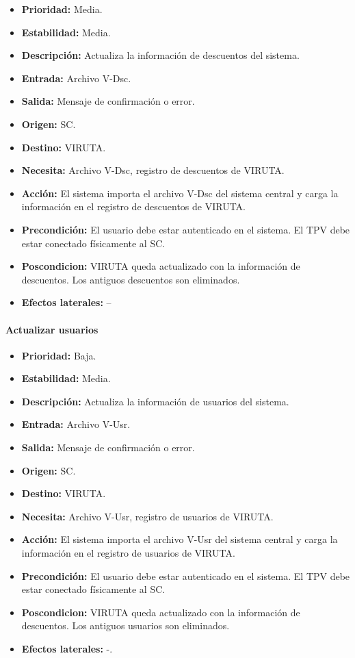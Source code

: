 \begin{itemize}
\item \textbf{Prioridad:} Media.
\item \textbf{Estabilidad:} Media.
\item \textbf{Descripción:} Actualiza la información de descuentos del sistema.
\item \textbf{Entrada:} Archivo V-Dsc.
\item \textbf{Salida:} Mensaje de confirmación o error.
\item \textbf{Origen:} SC.
\item \textbf{Destino:} VIRUTA.
\item \textbf{Necesita:} Archivo V-Dsc, registro de descuentos de VIRUTA.
\item \textbf{Acción:} El sistema importa el archivo V-Dsc del sistema central y carga la información en el registro de descuentos de VIRUTA.
\item \textbf{Precondición:} El usuario debe estar autenticado en el sistema. El TPV debe estar conectado físicamente al SC.
\item \textbf{Poscondicion:} VIRUTA queda actualizado con la información de descuentos. Los antiguos descuentos son eliminados.
\item \textbf{Efectos laterales:} --
\end{itemize}

\paragraph{Actualizar usuarios}

\begin{itemize}
\item \textbf{Prioridad:} Baja.
\item \textbf{Estabilidad:} Media.
\item \textbf{Descripción:} Actualiza la información de usuarios del sistema.
\item \textbf{Entrada:} Archivo V-Usr.
\item \textbf{Salida:} Mensaje de confirmación o error.
\item \textbf{Origen:} SC.
\item \textbf{Destino:} VIRUTA.
\item \textbf{Necesita:} Archivo V-Usr, registro de usuarios de VIRUTA.
\item \textbf{Acción:} El sistema importa el archivo V-Usr del sistema central y carga la información en el registro de usuarios de VIRUTA.
\item \textbf{Precondición:} El usuario debe estar autenticado en el sistema. El TPV debe estar conectado físicamente al SC.
\item \textbf{Poscondicion:} VIRUTA queda actualizado con la información de descuentos. Los antiguos usuarios son eliminados.
\item \textbf{Efectos laterales:} -.

\end{itemize}

